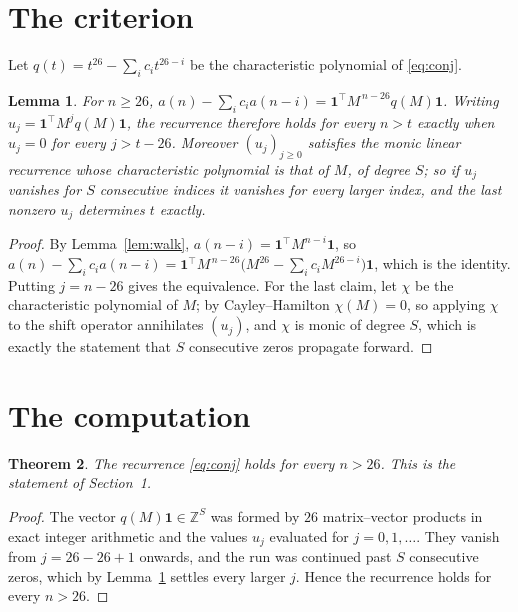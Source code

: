 \documentclass[11pt,a4paper]{article}
\theoremstyle{plain}
\newtheorem{theorem}{Theorem}
\newtheorem{lemma}[theorem]{Lemma}
\theoremstyle{definition}
\begin{document}
\section{The criterion}

Let $q(t)=t^{26}-\sum_i c_i t^{26-i}$ be the characteristic polynomial of
\eqref{eq:conj}.

\begin{lemma}\label{lem:crit}
For $n\ge26$,
$a(n)-\sum_i c_i a(n-i)=\mathbf{1}^{\!\top}M^{\,n-26}q(M)\mathbf{1}$. Writing
$u_j=\mathbf{1}^{\!\top}M^{j}q(M)\mathbf{1}$, the recurrence therefore holds for every
$n>t$ exactly when $u_j=0$ for every $j>t-26$. Moreover $(u_j)_{j\ge0}$ satisfies the
monic linear recurrence whose characteristic polynomial is that of $M$, of degree $S$; so
if $u_j$ vanishes for $S$ consecutive indices it vanishes for every larger index, and the
last nonzero $u_j$ determines $t$ exactly.
\end{lemma}

\begin{proof}
By Lemma~\ref{lem:walk}, $a(n-i)=\mathbf{1}^{\!\top}M^{n-i}\mathbf{1}$, so
$a(n)-\sum_i c_i a(n-i)
=\mathbf{1}^{\!\top}M^{\,n-26}\bigl(M^{26}-\sum_i c_i M^{26-i}\bigr)
\mathbf{1}$, which is the identity. Putting $j=n-26$ gives the equivalence. For the
last claim, let $\chi$ be the characteristic polynomial of $M$; by Cayley--Hamilton
$\chi(M)=0$, so applying $\chi$ to the shift operator annihilates $(u_j)$, and $\chi$ is
monic of degree $S$, which is exactly the statement that $S$ consecutive zeros propagate
forward.
\end{proof}

\section{The computation}

\begin{theorem}
The recurrence \eqref{eq:conj} holds for every $n>26$. This is the statement of
Section~1.
\end{theorem}

\begin{proof}
The vector $q(M)\mathbf{1}\in\mathbb{Z}^{S}$ was formed by $26$ matrix--vector
products in exact integer arithmetic and the values $u_j$ evaluated for
$j=0,1,\dots$. They vanish from $j=26-26+1$ onwards, and the run was continued past
$S$ consecutive zeros, which by Lemma~\ref{lem:crit} settles every larger $j$. Hence the
recurrence holds for every $n>26$.
\end{proof}
\end{document}
